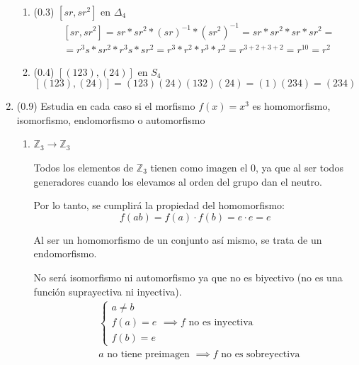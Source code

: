 \documentclass[a4paper,12pt]{article}
\begin{document}
\begin{enumerate}
    \begin{enumerate}
        \item (0.3) $[sr, sr^2]$ en $\Delta_{4}$
        \begin{equation*}
            \begin{split}
            & [sr, sr^2] = sr * sr^2 * (sr)^{-1}  * (sr^2)^{-1} = sr * sr^2 * sr * sr^2 =\\
            & = r^3s * sr^2 * r^3s * sr^2 = r^3 * r^2 * r^3 * r^2 = r^{3+2+3+2} = r^{10} = r^2   
            \end{split}
        \end{equation*}

        \item (0.4) $[(123),(24)]$ en $S_{4}$
        $$[(123),(24)] = (123)(24)(132)(24) = (1)(234) = (234)$$
    \end{enumerate}

    \pagebreak

    \item (0.9) Estudia en cada caso si el morfismo $f(x) = x^3$ es homomorfismo, isomorfismo, endomorfismo o automorfismo

    \begin{enumerate}
        \item $\mathbb{Z}_3 \to \mathbb{Z}_3$

        Todos los elementos de $\mathbb{Z}_3$ tienen como imagen el 0, ya que al ser todos generadores cuando los elevamos al orden del grupo dan el neutro.

        Por lo tanto, se cumplirá la propiedad del homomorfismo:
        $$
        f(ab) = f(a)\cdot f(b) = e \cdot e = e
        $$

        Al ser un homomorfismo de un conjunto así mismo, se trata de un endomorfismo.

        No será isomorfismo ni automorfismo ya que no es biyectivo (no es una función suprayectiva ni inyectiva).
        \begin{equation*}
            \begin{split}
                & \begin{cases}
                    a \neq b\\
                    f(a) = e\\
                    f(b) = e
                \end{cases} \implies f \text{ no es inyectiva }\\
                & a \text{ no tiene preimagen } \implies f \text{ no es sobreyectiva}
            \end{split}
        \end{equation*}


\end{enumerate}
\end{enumerate}
\end{document}
